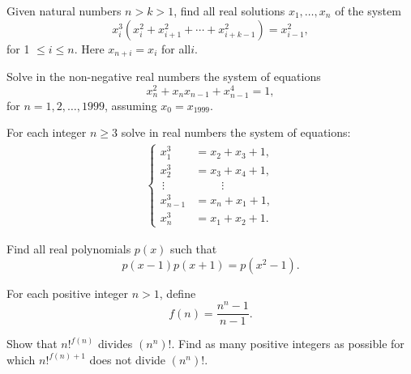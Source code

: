\documentclass[12pt,a4paper]{memoir}
\theoremstyle{definition}
\begin{document}
\begin{question}[name={1996 Austrian--Polish}]
	Given natural numbers $n > k > 1$, find all real solutions $x_1,\dots, x_n$ of the system $$x_i^3(x_i^2 + x_{i+1}^2+ \cdots +x_{i+k-1}^2) = x_{i-1}^2,$$ for 1 $\le i \le n$. Here $x_{n+i} = x_i$ for all$ i$.
\end{question}


\begin{question}[name={1999 Austrian--Polish}]
	Solve in the non-negative real numbers the system of equations
	\[x_n^2 + x_nx_{n-1} + x_{n-1}^4 = 1,\]
	for $n = 1,2,\dots,1999$, assuming $x_0 = x_{1999}$.
\end{question}


\begin{question}[name={2000 Austrian--Polish}]
	For each integer $n \ge 3$ solve in real numbers the system of equations:
	\begin{align*}
		\begin{cases}
			x_1^3 &= x_2 + x_3 + 1,\\
			x_2^3 &= x_3 + x_4 + 1,\\
			\, \vdots &\phantom{=} \quad\vdots\\
			x_{n-1}^3 &= x_n+ x_1 + 1,\\
			x_{n}^3 &= x_1+ x_2 + 1.
		\end{cases}
	\end{align*}
\end{question}



\begin{question}[name={2003 Austrian--Polish}]
	Find all real polynomials $p(x) $ such that \[p(x-1)p(x+1)= p(x^2-1).\]
\end{question}


\begin{question}[name={2003 Austrian--Polish}]
	For each positive integer $n>1$, define \[f(n) = \frac{n^n - 1}{n - 1}.\]
	\begin{tasks}
		\task Show that $n!^{f(n)}$ divides $(n^n)!$.
		\task Find as many positive integers as possible for which $n!^{f(n)+1}$ does not divide $(n^n)!$.
	\end{tasks} 
\end{question}
\end{document}
